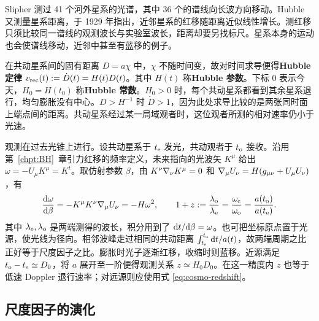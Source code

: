 Slipher 测过 41 个河外星系的光谱，其中 36 个的谱线向长波方向移动。Hubble 又测量星系距离，于 1929 年指出，近邻星系的红移随距离近似线性增长。测红移只须比较同一谱线的观测波长与实验室波长，距离却要另找标尺。星系本身的运动也会使谱线移动，近邻中甚至有蓝移的例子。

在共动星系间的固有距离 $D=a\chi$ 中，$\chi$ 不随时间变，故对时间求导便得\textbf{Hubble 定律} $v_{\rm rec}(t):=\dot D(t)=H(t)D(t)$。其中 $H(t)$ 称\textbf{Hubble 参数}。下标 $0$ 表示今天，$H_0=H(t_0)$ 称\textbf{Hubble 常数}。$H_0>0$ 时，每个共动星系都看到其余星系退行，均匀膨胀没有中心。$D>H^{-1}$ 时 $\dot D>1$，因为此处求导比较的是两张同时面上端点间的距离。共动星系经过某一局域观者时，这位观者所测的相对速率仍小于光速。

观测在过去光锥上进行。设共动星系于 $t_{\rm e}$ 发光，共动观者于 $t_{\rm o}$ 接收。沿用第~\ref{chpt:BH}~章引力红移的频率定义，未来指向的光波矢 $K^\mu$ 给出 $\omega=-U_\mu K^\mu=K^t$。取仿射参数 $\beta$，由 $K^\nu\nabla_\nu K^\mu=0$ 和 $\nabla_\mu U_\nu=H(g_{\mu\nu}+U_\mu U_\nu)$，有
\begin{equation}\label{eq:cosmo-redshift}
    \frac{\dd\omega}{\dd\beta}
    =-K^\mu K^\nu\nabla_\mu U_\nu=-H\omega^2,
    \qquad
    1+z:=\frac{\lambda_{\rm o}}{\lambda_{\rm e}}
    =\frac{\omega_{\rm e}}{\omega_{\rm o}}
    =\frac{a(t_{\rm o})}{a(t_{\rm e})}.
\end{equation}
其中 $\lambda_{\rm e},\lambda_{\rm o}$ 是两端测得的波长，积分用到了 $\dd t/\dd\beta=\omega$。也可把坐标原点置于光源，使光线为径向。相邻波峰走过相同的共动距离 $\int_{t_{\rm e}}^{t_{\rm o}}\dd t/a(t)$，故两端周期之比正好等于尺度因子之比。膨胀时光子逐渐红移，收缩时则蓝移。近源满足 $t_{\rm o}-t_{\rm e}\simeq D_0$，将 $a$ 展开至一阶便得观测关系 $z\simeq H_0D_0$。在这一精度内 $z$ 也等于低速 Doppler 退行速率；对远源则应使用式 \eqref{eq:cosmo-redshift}。

\subsection{尺度因子的演化}

